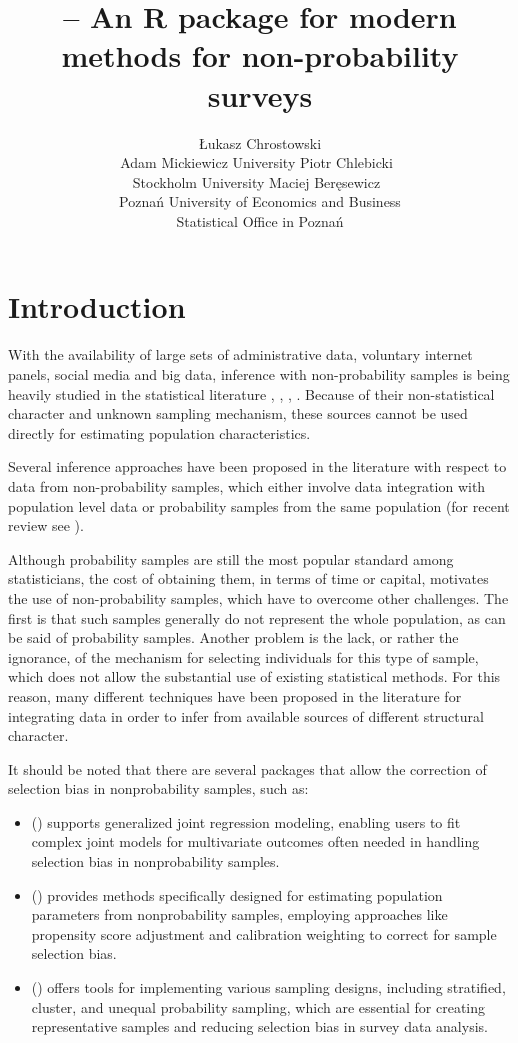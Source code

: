 \documentclass[
]{jss}
\author{
Łukasz Chrostowski\\Adam Mickiewicz University \And Piotr
Chlebicki~\orcidlink{0009-0006-4867-7434}\\Stockholm University
\AND Maciej Beręsewicz~\orcidlink{0000-0002-8281-4301}\\Poznań
University of Economics and Business\\
Statistical Office in Poznań
}
\title{\pkg{nonprobsvy} -- An R package for modern methods for
non-probability surveys}
\begin{document}
\hypertarget{introduction}{%
\section{Introduction}\label{introduction}}

With the availability of large sets of administrative data, voluntary
internet panels, social media and big data, inference with
non-probability samples is being heavily studied in the statistical
literature \cite{beaumont2020probability},
\cite{elliott_inference_2017}, \cite{berkesewicz2017two},
\cite{citro2014multiple}. Because of their non-statistical character and
unknown sampling mechanism, these sources cannot be used directly for
estimating population characteristics.

Several inference approaches have been proposed in the literature with
respect to data from non-probability samples, which either involve data
integration with population level data or probability samples from the
same population (for recent review see \cite{wu2022statistical}).

Although probability samples are still the most popular standard among
statisticians, the cost of obtaining them, in terms of time or capital,
motivates the use of non-probability samples, which have to overcome
other challenges. The first is that such samples generally do not
represent the whole population, as can be said of probability samples.
Another problem is the lack, or rather the ignorance, of the mechanism
for selecting individuals for this type of sample, which does not allow
the substantial use of existing statistical methods. For this reason,
many different techniques have been proposed in the literature for
integrating data in order to infer from available sources of different
structural character.

It should be noted that there are several packages that allow the
correction of selection bias in nonprobability samples, such as:

\begin{itemize}
\item {} (\cite{GJRM}) supports generalized joint regression modeling, enabling users to fit complex joint models for multivariate outcomes often needed in handling selection bias in nonprobability samples.
\item {} (\cite{NonProbEst}) provides methods specifically designed for estimating population parameters from nonprobability samples, employing approaches like propensity score adjustment and calibration weighting to correct for sample selection bias.
\item {} (\cite{sampling}) offers tools for implementing various sampling designs, including stratified, cluster, and unequal probability sampling, which are essential for creating representative samples and reducing selection bias in survey data analysis.
\end{itemize}
\end{document}
